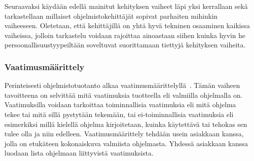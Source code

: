 \documentclass[finnish]{../tktltiki2}
\theoremstyle{definition}
\theoremstyle{remark}
\begin{document}
Seuraavaksi käydään edellä mainitut kehityksen vaiheet läpi yksi kerrallaan
sekä tarkastellaan millaiset ohjelmistokehittäjät sopivat
parhaiten mihinkin vaiheeseen. Oletetaan, että kehittäjillä on
yhtä hyvä tekninen osaaminen kaikissa vaiheissa, jolloin tarkastelu
voidaan rajoittaa ainoastaan siihen kuinka hyvin he persoonallisuustyypeiltään soveltuvat suorittamaan tiettyjä
kehityksen vaiheita.

\subsubsection{Vaatimusmäärittely}

Perinteisesti ohjelmistotuotanto alkaa vaatimusmäärittelyllä~\cite{SWEBOK:409902,Sommerville:2005:IRE:1042197.1042341}. Tämän vaiheen tavoitteena on selvittää mitä vaatimuksia
tuotteella eli valmiilla ohjelmalla on. Vaatimuksilla voidaan tarkoittaa toiminnallisia vaatimuksia eli
mitä ohjelma tekee tai mitä sillä pystytään tekemään, tai ei-toiminnallisia vaatimuksia eli esimerkiksi millä kielellä
ohjelma kirjoitetaan, kuinka käytettävä tai tehokas sen tulee olla ja niin edelleen. Vaatimusmäärittely tehdään usein asiakkaan kanssa, jolla on etukäteen kokonaiskuva valmiista ohjelmasta. Yhdessä asiakkaan kanssa luodaan lista ohjelmaan liittyvistä vaatimuksista.\\

\end{document}
